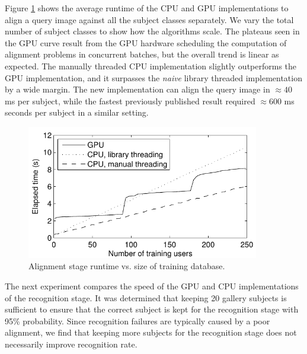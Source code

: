Figure \ref{fig:alignment_stage_runtime} shows the average runtime of the CPU and GPU implementations to align
a query image against all the subject classes separately. We vary the total number of
subject classes to show how the algorithms scale. The plateaus seen in the GPU curve
result from the GPU hardware scheduling the computation of alignment
problems in concurrent batches, but the overall trend is linear as expected.
The manually threaded CPU implementation slightly outperforms the GPU implementation,
and it surpasses the \emph{naive}
library threaded implementation by a wide margin.
The new implementation can align the query
image in $\approx 40$ ms per subject, 
while the fastest previously published result \cite{WagnerA2011-PAMI}
required $\approx 600$ ms seconds per subject in a similar setting.  

\begin{figure}[t!]
\centering
\includegraphics[width=4in]{figures_ijcb/alignment_runtime_graph.pdf}
\caption{Alignment stage runtime vs. size of training database.} 
\label{fig:alignment_stage_runtime}
\end{figure}

The next experiment compares the speed of the GPU and CPU implementations of
the recognition stage.  It was determined that keeping 20 gallery subjects is
sufficient to ensure that the correct subject is kept for the recognition stage
with 95\% probability.  Since recognition failures are typically caused by a
poor alignment, we find that keeping more subjects for the recognition stage does
not necessarily improve recognition rate.

